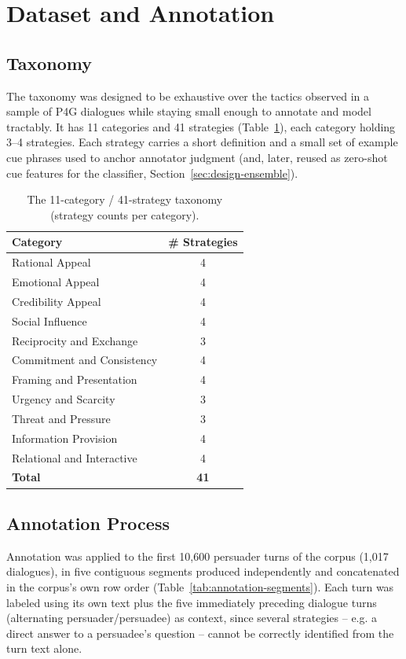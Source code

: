 \section{Dataset and Annotation}
\label{sec:annotation}

\subsection{Taxonomy}
\label{sec:taxonomy}

The taxonomy was designed to be exhaustive over the tactics observed in a
sample of P4G dialogues while staying small enough to annotate and model
tractably. It has 11 categories and 41 strategies (Table~\ref{tab:taxonomy}),
each category holding 3--4 strategies. Each strategy carries a short
definition and a small set of example cue phrases used to anchor annotator
judgment (and, later, reused as zero-shot cue features for the classifier,
Section~\ref{sec:design-ensemble}).

\begin{table}[H]
\centering
\caption{The 11-category / 41-strategy taxonomy (strategy counts per category).}
\label{tab:taxonomy}
\begin{tabular}{@{}lc@{}}
\toprule
\textbf{Category} & \textbf{\# Strategies} \\
\midrule
Rational Appeal & 4 \\
Emotional Appeal & 4 \\
Credibility Appeal & 4 \\
Social Influence & 4 \\
Reciprocity and Exchange & 3 \\
Commitment and Consistency & 4 \\
Framing and Presentation & 4 \\
Urgency and Scarcity & 3 \\
Threat and Pressure & 3 \\
Information Provision & 4 \\
Relational and Interactive & 4 \\
\midrule
\textbf{Total} & \textbf{41} \\
\bottomrule
\end{tabular}
\end{table}

\subsection{Annotation Process}

Annotation was applied to the first 10{,}600 persuader turns of the corpus
(1{,}017 dialogues), in five contiguous segments produced independently and
concatenated in the corpus's own row order (Table~\ref{tab:annotation-segments}).
Each turn was labeled using its own text plus the five immediately preceding
dialogue turns (alternating persuader/persuadee) as context, since several
strategies -- e.g. a direct answer to a persuadee's question -- cannot be
correctly identified from the turn text alone.

